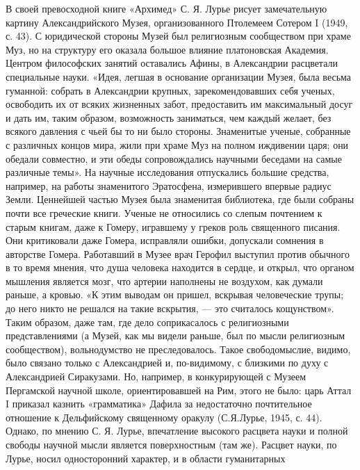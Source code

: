 В своей превосходной книге «Архимед»  С. Я. Лурье рисует замечательную
картину  Александрийского  Музея,  организованного  Птолемеем  Сотером
I  (1949,  с.  43).  С   юридической  стороны  Музей  был  религиозным
сообществом  при  храме  Муз,  но на  структуру  его  оказала  большое
влияние платоновская Академия.  Центром философских занятий оставались
Афины,  в  Александрии  расцветали специальные  науки.  «Идея,  легшая
в  основание  организации  Музея,  была  весьма  гуманной:  собрать  в
Александрии крупных,  зарекомендовавших себя ученых, освободить  их от
всяких жизненных забот, предоставить им  максимальный досуг и дать им,
таким образом, возможность заниматься,  чем каждый желает, без всякого
давления с чьей бы то ни  было стороны. Знаменитые ученые, собранные с
различных концов  мира, жили при  храме Муз на полном  иждивении царя;
они обедали совместно, и эти обеды сопровождались научными беседами на
самые  различные темы».  На научные  исследования отпускались  большие
средства,  например,  на  работы знаменитого  Эратосфена,  измерившего
впервые  радиус   Земли.  Ценнейшей   частью  Музея   была  знаменитая
библиотека,  где были  собраны почти  все греческие  книги. Ученые  не
относились  со  слепым  почтением  к старым  книгам,  даже  к  Гомеру,
игравшему  у  греков роль  священного  писания.  Они критиковали  даже
Гомера,  исправляли ошибки,  допускали  сомнения  в авторстве  Гомера.
Работавший  в  Музее  врач  Герофил  выступил  против  обычного  в  то
время  мнения, что  душа человека  находится в  сердце, и  открыл, что
органом  мышления является  мозг, что  артерии наполнены  не воздухом,
как  думали раньше,  а кровью.  «К  этим выводам  он пришел,  вскрывая
человеческие  трупы;  до него  никто  не  решался на  такие  вскрытия,
---  это считалось  кощунством».  Таким образом,  даже  там, где  дело
соприкасалось с  религиозными представлениями (а Музей,  как мы видели
раньше,  был  по  мысли  религиозным  сообществом),  вольнодумство  не
преследовалось.  Такое свободомыслие,  видимо, было  связано только  с
Александрией  и,  по-видимому,  с  близкими  по  духу  с  Александрией
Сиракузами. Но, например, в  конкурирующей с Музеем Пергамской научной
школе, ориентировавшей  на Рим, этого  не было: царь Аттал  I приказал
казнить «грамматика»  Дафила за недостаточно почтительное  отношение к
Дельфийскому священному  оракулу (С.Я.Лурье, 1945, с.  44). Однако, по
мнению  С. Я.  Лурье,  впечатление высокого  расцвета  науки и  полной
свободы научной мысли является  поверхностным (там же). Расцвет науки,
по  Лурье,  носил односторонний  характер,  и  в области  гуманитарных
